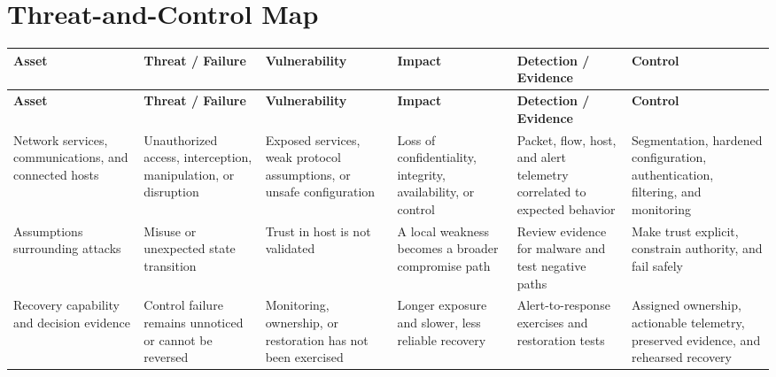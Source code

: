 \documentclass[11pt]{article}
\begin{document}
\section*{Threat-and-Control Map}
\begingroup\scriptsize\setlength{\tabcolsep}{2pt}
\begin{longtable}{>{\RaggedRight\arraybackslash}p{}>{\RaggedRight\arraybackslash}p{}>{\RaggedRight\arraybackslash}p{}>{\RaggedRight\arraybackslash}p{}>{\RaggedRight\arraybackslash}p{}>{\RaggedRight\arraybackslash}p{}}
\toprule\rowcolor{Navy}\color{white}\textbf{Asset} & \color{white}\textbf{Threat / Failure} & \color{white}\textbf{Vulnerability} & \color{white}\textbf{Impact} & \color{white}\textbf{Detection / Evidence} & \color{white}\textbf{Control}\\\midrule
\endfirsthead
\toprule\rowcolor{Navy}\color{white}\textbf{Asset} & \color{white}\textbf{Threat / Failure} & \color{white}\textbf{Vulnerability} & \color{white}\textbf{Impact} & \color{white}\textbf{Detection / Evidence} & \color{white}\textbf{Control}\\\midrule
\endhead
Network services, communications, and connected hosts & Unauthorized access, interception, manipulation, or disruption & Exposed services, weak protocol assumptions, or unsafe configuration & Loss of confidentiality, integrity, availability, or control & Packet, flow, host, and alert telemetry correlated to expected behavior & Segmentation, hardened configuration, authentication, filtering, and monitoring\\\midrule
Assumptions surrounding attacks & Misuse or unexpected state transition & Trust in host is not validated & A local weakness becomes a broader compromise path & Review evidence for malware and test negative paths & Make trust explicit, constrain authority, and fail safely\\\midrule
Recovery capability and decision evidence & Control failure remains unnoticed or cannot be reversed & Monitoring, ownership, or restoration has not been exercised & Longer exposure and slower, less reliable recovery & Alert-to-response exercises and restoration tests & Assigned ownership, actionable telemetry, preserved evidence, and rehearsed recovery\\\midrule
\bottomrule
\end{longtable}
\endgroup
\end{document}
